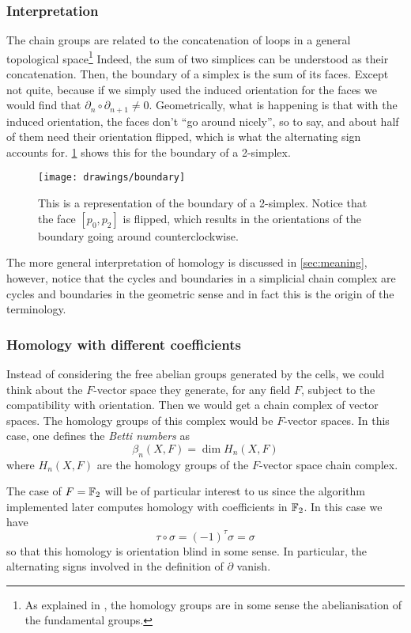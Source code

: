 \documentclass[../main.tex]{subfiles}
\begin{document}
\subsubsection{Interpretation}
The chain groups are related to the concatenation of loops in a general topological
space\footnote{As explained in \cite{hatcher}, the homology groups are in some sense the
abelianisation of the fundamental groups.} Indeed, the sum of two simplices can be
understood as their concatenation. Then, the boundary of a simplex is the sum of its
faces. Except not quite, because if we simply used the induced orientation for the faces
we would find that \( \partial_{n} \circ \partial_{n+1} \neq 0 \). Geometrically, what is
happening is that with the induced orientation, the faces don't ``go around nicely'', so
to say, and about half of them need their orientation flipped, which is what the
alternating sign accounts for. \cref{fig:boundary} shows this for the boundary of a
2-simplex.
\begin{figure}[htb]
	\centering
	\texttt{[image: drawings/boundary]}
	\caption{This is a representation of the boundary of a 2-simplex. Notice that the face
		\( [p_0, p_2] \) is flipped, which results in the orientations of the boundary going
	around counterclockwise.}
	\label{fig:boundary}
\end{figure}
The more general interpretation of homology is discussed in \cref{sec:meaning}, however,
notice that the cycles and boundaries in a simplicial chain complex are cycles and
boundaries in the geometric sense and in fact this is the origin of the terminology. 

\subsubsection{Homology with different coefficients} \label{sec:different coefficients}
Instead of considering the free abelian groups generated by the cells, we could think
about the \( F \)-vector space they generate, for any field \( F \), subject to the
compatibility with orientation. Then we would get a chain complex of vector spaces. The
homology groups of this complex would be \( F \)-vector spaces. In this case, one defines
the \emph{Betti numbers} as
\begin{equation*}
	\beta_n(X, F) = \dim H_n(X, F)
\end{equation*}
where \( H_n(X, F) \) are the homology groups of the \( F \)-vector space chain
complex. 

The case of \( F = \mathbb{F}_2 \) will be of particular interest to us since the algorithm
implemented later computes homology with coefficients in \( \mathbb{F}_2 \). In this case we have
\begin{equation*}
	\tau \circ \sigma = (-1)^\tau \sigma = \sigma
\end{equation*}
so that this homology is orientation blind in some sense. In particular, the alternating
signs involved in the definition of \( \partial \) vanish. 
\end{document}
